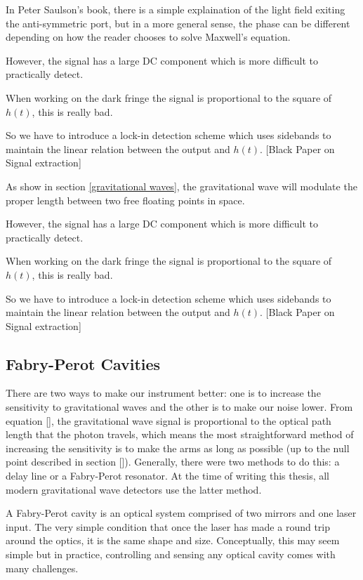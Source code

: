 \documentclass[oneside]{book}
\begin{document}
		In Peter Saulson's book, there is a simple explaination of the light field exiting the anti-symmetric port, but in a more general sense, the phase can be different depending on how the reader chooses to solve Maxwell's equation.
		
		However, the signal has a large DC component which is more difficult to practically detect.  
		
		When working on the dark fringe the signal is proportional to the square of $h(t)$, this is really bad.
		
		So we have to introduce a lock-in detection scheme which uses sidebands to maintain the linear relation between the output and $h(t)$.
		[Black Paper on Signal extraction]
		
		As show in section \ref{gravitational waves}, the gravitational wave will modulate the proper length between two free floating points in space. 
	
		However, the signal has a large DC component which is more difficult to practically detect.  
		
		When working on the dark fringe the signal is proportional to the square of $h(t)$, this is really bad.
		
		So we have to introduce a lock-in detection scheme which uses sidebands to maintain the linear relation between the output and $h(t)$.
		[Black Paper on Signal extraction]	
	
		\subsection{Fabry-Perot Cavities}\label{FP}
		There are two ways to make our instrument better: one is to increase the sensitivity to gravitational waves and the other is to make our noise lower. From equation [], the gravitational wave signal is proportional to the optical path length that the photon travels, which means the most straightforward method of increasing the sensitivity is to make the arms as long as possible (up to the null point described in section []).  Generally, there were two methods to do this: a delay line or a Fabry-Perot resonator.  At the time of writing this thesis, all modern gravitational wave detectors use the latter method.
	
		A Fabry-Perot cavity is an optical system comprised of two mirrors and one laser input. The very simple condition that once the laser has made a round trip around the optics, it is the same shape and size.  Conceptually, this may seem simple but in practice, controlling and sensing any optical cavity comes with many challenges.
		
\end{document}
